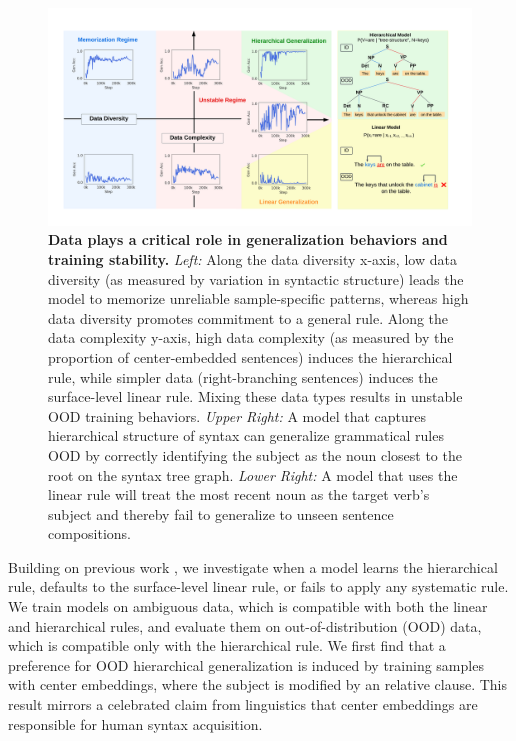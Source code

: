 \begin{figure}
    \centering
    \includegraphics[width=1.0\textwidth]{figures/stability_demo.pdf}
    \caption{\textbf{Data plays a critical role in generalization behaviors and training stability.} 
    \textit{Left:} 
    Along the data diversity x-axis, low data diversity (as measured by variation in syntactic structure) leads the model to memorize unreliable sample-specific patterns, whereas high data diversity promotes commitment to a general rule. 
    Along the data complexity y-axis, high data complexity (as measured by the proportion of center-embedded sentences) induces the hierarchical rule, while simpler data (right-branching sentences) induces the surface-level linear rule. Mixing these data types results in unstable OOD training behaviors. 
    \textit{Upper Right:} A model that captures hierarchical structure of syntax can generalize grammatical rules OOD by correctly identifying the subject as the noun closest to the root on the syntax tree graph. 
    \textit{Lower Right:} A model that uses the linear rule will treat the most recent noun as the target verb's subject and thereby fail to generalize to unseen sentence compositions.
    } 
    \label{fig:stability_demo}
\end{figure}


Building on previous work \citep{McCoy2018-uv, McCoy2020-pj, Ahuja2024-ul, Murty2023-xp}, we investigate when a model learns the hierarchical rule, defaults to the surface-level linear rule, or fails to apply any systematic rule. We train models on ambiguous data, which is compatible with both the linear and hierarchical rules, and evaluate them on  out-of-distribution (OOD) data, which is compatible only with the hierarchical rule.
We first find that a preference for OOD hierarchical generalization is induced by training samples with center embeddings, where the subject is modified by an relative clause.  This result mirrors a celebrated claim from linguistics \citep{wexler1980formal} that center embeddings are responsible for human syntax acquisition. 


